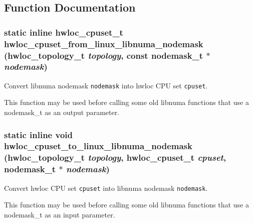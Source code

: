 \subsection{Function Documentation}
\hypertarget{group__hwlocality__linux__libnuma__nodemask_gc199bbdcd7913ce17bd36a168e00991f}{
\subsubsection[{hwloc\_\-cpuset\_\-from\_\-linux\_\-libnuma\_\-nodemask}]{\setlength{\rightskip}{0pt plus 5cm}static inline {\bf hwloc\_\-cpuset\_\-t} hwloc\_\-cpuset\_\-from\_\-linux\_\-libnuma\_\-nodemask ({\bf hwloc\_\-topology\_\-t} {\em topology}, \/  const nodemask\_\-t $\ast$ {\em nodemask})}}
\label{group__hwlocality__linux__libnuma__nodemask_gc199bbdcd7913ce17bd36a168e00991f}


Convert libnuma nodemask {\tt nodemask} into hwloc CPU set {\tt cpuset}. 

This function may be used before calling some old libnuma functions that use a nodemask\_\-t as an output parameter. \hypertarget{group__hwlocality__linux__libnuma__nodemask_gd6c037010e89674b799ed8131d7a632c}{
\subsubsection[{hwloc\_\-cpuset\_\-to\_\-linux\_\-libnuma\_\-nodemask}]{\setlength{\rightskip}{0pt plus 5cm}static inline void hwloc\_\-cpuset\_\-to\_\-linux\_\-libnuma\_\-nodemask ({\bf hwloc\_\-topology\_\-t} {\em topology}, \/  {\bf hwloc\_\-cpuset\_\-t} {\em cpuset}, \/  nodemask\_\-t $\ast$ {\em nodemask})}}
\label{group__hwlocality__linux__libnuma__nodemask_gd6c037010e89674b799ed8131d7a632c}


Convert hwloc CPU set {\tt cpuset} into libnuma nodemask {\tt nodemask}. 

This function may be used before calling some old libnuma functions that use a nodemask\_\-t as an input parameter. 
